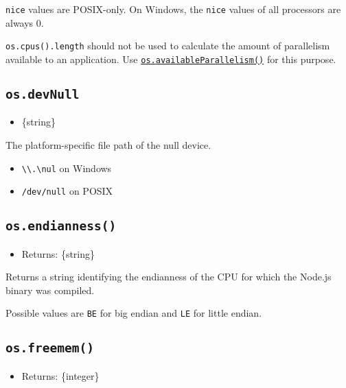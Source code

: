 \texttt{nice} values are POSIX-only. On Windows, the \texttt{nice}
values of all processors are always 0.

\texttt{os.cpus().length} should not be used to calculate the amount of
parallelism available to an application. Use
\hyperref[osavailableparallelism]{\texttt{os.availableParallelism()}}
for this purpose.

\subsection{\texorpdfstring{\texttt{os.devNull}}{os.devNull}}\label{os.devnull}

\begin{itemize}
\tightlist
\item
  \{string\}
\end{itemize}

The platform-specific file path of the null device.

\begin{itemize}
\tightlist
\item
  \texttt{\textbackslash{}\textbackslash{}.\textbackslash{}nul} on
  Windows
\item
  \texttt{/dev/null} on POSIX
\end{itemize}

\subsection{\texorpdfstring{\texttt{os.endianness()}}{os.endianness()}}\label{os.endianness}

\begin{itemize}
\tightlist
\item
  Returns: \{string\}
\end{itemize}

Returns a string identifying the endianness of the CPU for which the
Node.js binary was compiled.

Possible values are \texttt{\textquotesingle{}BE\textquotesingle{}} for
big endian and \texttt{\textquotesingle{}LE\textquotesingle{}} for
little endian.

\subsection{\texorpdfstring{\texttt{os.freemem()}}{os.freemem()}}\label{os.freemem}

\begin{itemize}
\tightlist
\item
  Returns: \{integer\}
\end{itemize}

